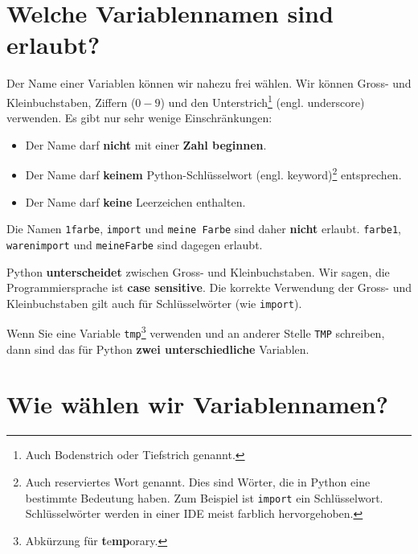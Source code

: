 \section{Welche Variablennamen sind erlaubt?}
\label{sec:welche-variablennamen-sind-erlaubt}

Der Name einer Variablen können wir nahezu frei wählen. Wir können Gross- und Kleinbuchstaben, Ziffern ($0-9$) und den Unterstrich\footnote{Auch Bodenstrich oder Tiefstrich genannt.} (engl. underscore) verwenden. Es gibt nur sehr wenige Einschränkungen:

\begin{itemize}
\item Der Name darf \textbf{nicht} mit einer \textbf{Zahl beginnen}.
\item Der Name darf \textbf{keinem} Python-Schlüsselwort (engl. keyword)\footnote{Auch reserviertes Wort genannt. Dies sind Wörter, die in Python eine bestimmte Bedeutung haben. Zum Beispiel ist \lstinline[language={python3}]{import} ein Schlüsselwort. Schlüsselwörter werden in einer \ac{IDE} meist farblich hervorgehoben.} entsprechen.
\item Der Name darf \textbf{keine} Leerzeichen enthalten.
\end{itemize}

Die Namen \lstinline[language={python3}]{1farbe}, \lstinline[language={python3}]{import} und \lstinline[language={python3}]{meine Farbe} sind daher \textbf{nicht} erlaubt. \lstinline[language={python3}]{farbe1}, \lstinline[language={python3}]{warenimport} und \lstinline[language={python3}]{meineFarbe} sind dagegen erlaubt.

\begin{important}
Python \textbf{unterscheidet} zwischen Gross- und Kleinbuchstaben. Wir sagen, die Programmiersprache ist \textbf{case sensitive}. Die korrekte Verwendung der Gross- und Kleinbuchstaben gilt auch für Schlüsselwörter (wie \lstinline[language={python3}]{import}).
\end{important}

\begin{example}
Wenn Sie eine Variable \lstinline[language={python3}]{tmp}\footnote{Abkürzung für \textbf{t}e\textbf{mp}orary.} verwenden und an anderer Stelle \lstinline[language={python3}]{TMP} schreiben, dann sind das für Python \textbf{zwei unterschiedliche} Variablen.
\end{example}

\section{Wie wählen wir Variablennamen?}
\label{sec:wie-waehlen-wir-variablennamen}

